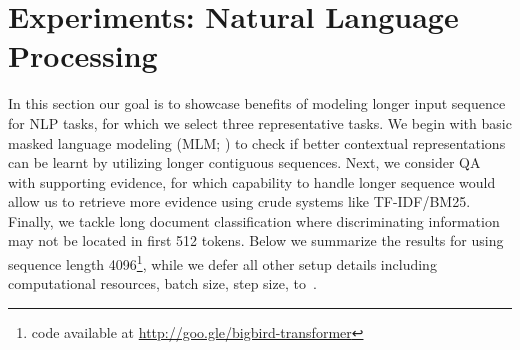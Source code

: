 \section{Experiments: Natural Language Processing} \label{sec:expt-nlp}

In this section our goal is to showcase benefits of modeling longer input sequence for NLP tasks, for which we select three representative tasks.
We begin with basic masked language modeling (MLM; \citealt{devlin2018bert}) to check if better contextual representations can be learnt by utilizing longer contiguous sequences.
Next, we consider QA with supporting evidence, for which capability to handle longer sequence would allow us to retrieve more evidence using crude systems like TF-IDF/BM25.
Finally, we tackle long document classification where discriminating information may not be located in first 512 tokens.
Below we summarize the results for \bigb using sequence length 4096\footnote{code available at \url{http://goo.gle/bigbird-transformer}}, while we defer all other setup details including computational resources, batch size, step size, to~. 


